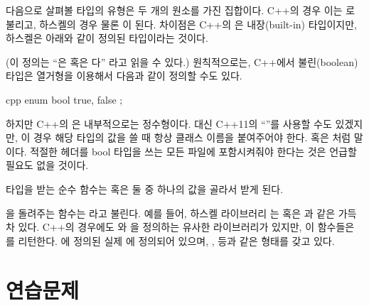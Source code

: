 다음으로 살펴볼 타입의 유형은 두 개의 원소를 가진 집합이다. C++의 경우 이는 로 불리고, 하스켈의 경우 물론 이 된다.
차이점은 C++의 은 내장(built-in) 타입이지만, 하스켈은 아래와 같이 정의된 타입이라는 것이다.

(이 정의는 ``은  혹은 다'' 라고 읽을 수 있다.)
원칙적으로는, C++에서 불린(boolean) 타입은 열거형을 이용해서 다음과 같이 정의할 수도 있다.

\begin{snip}{cpp}
enum bool { 
    true,
    false
};
\end{snip}
하지만 C++의 은 내부적으로는 정수형이다. 대신 C++11의 ``''를 사용할 수도 있겠지만, 이 경우 해당 타입의 값을 쓸 때 항상 클래스 이름을 붙여주어야 한다.
 혹은 처럼 말이다. 적절한 헤더를 bool 타입을 쓰는 모든 파일에 포함시켜줘야 한다는 것은 언급할 필요도 없을 것이다.

 타입을 받는 순수 함수는  혹은  둘 중 하나의 값을 골라서 받게 된다.

을 돌려주는 함수는 라고 불린다.
예를 들어, 하스켈 라이브러리 는  혹은 과 같은  가득 차 있다.
C++의 경우에도 와 을 정의하는 유사한 라이브러리가 있지만, 이 함수들은 를 리턴한다.
에 정의된 실제 \trPredicates\는 에 정의되어 있으며, ,  등과 같은 형태를 갖고 있다.

\section{연습문제}

